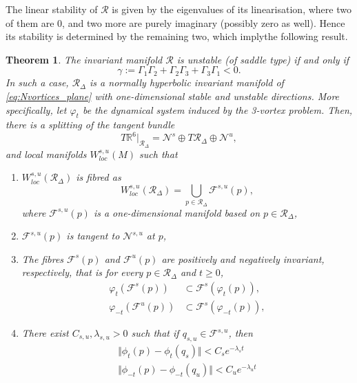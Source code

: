 \documentclass[a4paper]{article}
\numberwithin{equation}{section}
\newtheorem{theorem}{Theorem}[section]
\begin{document}
The linear stability of $\mathcal{R}$ is given by the eigenvalues of its linearisation, where two of them are $0$, and two more are purely imaginary (possibly zero as well). Hence its stability is determined by the remaining two, which implythe following result.
\begin{theorem}
The invariant manifold $\mathcal{R}$ is unstable (of saddle type) if and only if \begin{equation}
    \gamma:=\Gamma_1\Gamma_2 + \Gamma_2\Gamma_3 + \Gamma_3\Gamma_1 <0. 
\end{equation}
In such a case, $\mathcal{R}_\Delta$ is a \textit{normally hyperbolic invariant manifold} of \eqref{eq:Nvortices_plane} with one-dimensional stable and unstable directions. More specifically, let $\varphi_t$ be the dynamical system induced by the 3-vortex problem. Then, there is a splitting of the tangent bundle
\[ T\mathbb{R}^6\vert_{\mathcal{R}_\Delta} = \mathcal{N}^s \oplus T\mathcal{R}_\Delta \oplus\mathcal{N}^u, \]
and local manifolds $W^{s,u}_{loc}(M)$ such that 

\smallskip

\begin{enumerate}
    \item $W^{s,u}_{loc}(\mathcal{R}_\Delta)$ is fibred as
    \[W^{s,u}_{loc}(\mathcal{R}_\Delta)= \bigcup_{p\in \mathcal{R}_\Delta} \mathcal{F}^{s,u}(p),\]
    where $\mathcal{F}^{s,u}(p)$ is a one-dimensional manifold based on $p\in\mathcal{R}_\Delta$,
    \item $\mathcal{F}^{s,u}(p)$ is tangent to $\mathcal{N}^{s,u}$ at $p$,
    \item The fibres $\mathcal{F}^{s}(p)$ and $\mathcal{F}^{u}(p)$ are positively and negatively invariant, respectively, that is for every $p\in\mathcal{R}_\Delta$ and $t\geq 0$,
    \begin{align*}
        \varphi_{t}\left( \mathcal{F}^s(p) \right) &\subset \mathcal{F}^s\left( \varphi_t(p)\right), \\
         \varphi_{-t}\left( \mathcal{F}^u(p) \right) &\subset \mathcal{F}^s\left( \varphi_{-t}(p)\right),
    \end{align*}
    \item There exist $C_{s,u}, \lambda_{s,u}>0$ such that if $q_{s,u}\in\mathcal{F}^{s,u}$, then
    \begin{align*}
        \Vert \phi_t(p)-\phi_t(q_s) \Vert < C_se^{-\lambda_st} \\
        \Vert \phi_{-t}(p)-\phi_{-t}(q_u) \Vert < C_ue^{-\lambda_ut}
    \end{align*}
\end{enumerate}
\end{theorem}
\end{document}
